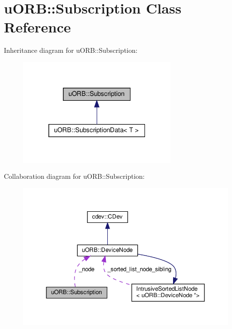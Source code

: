 \hypertarget{classuORB_1_1Subscription}{}\section{u\+O\+RB\+:\+:Subscription Class Reference}
\label{classuORB_1_1Subscription}


Inheritance diagram for u\+O\+RB\+:\+:Subscription\+:\nopagebreak
\begin{figure}[H]
\begin{center}
\leavevmode
\includegraphics[width=229pt]{db/d59/classuORB_1_1Subscription__inherit__graph}
\end{center}
\end{figure}


Collaboration diagram for u\+O\+RB\+:\+:Subscription\+:\nopagebreak
\begin{figure}[H]
\begin{center}
\leavevmode
\includegraphics[width=350pt]{db/d78/classuORB_1_1Subscription__coll__graph}
\end{center}
\end{figure}

